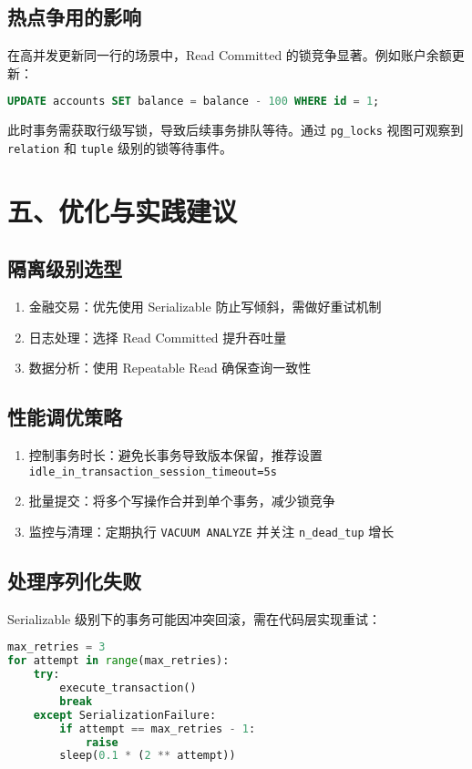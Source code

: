 \section{热点争用的影响}
在高并发更新同一行的场景中，Read Committed 的锁竞争显著。例如账户余额更新：\par
\begin{lstlisting}[language=sql]
UPDATE accounts SET balance = balance - 100 WHERE id = 1;
\end{lstlisting}
此时事务需获取行级写锁，导致后续事务排队等待。通过 \verb!pg_locks! 视图可观察到 \verb!relation! 和 \verb!tuple! 级别的锁等待事件。\par
\chapter{五、优化与实践建议}
\section{隔离级别选型}
\begin{enumerate}
\item 金融交易：优先使用 Serializable 防止写倾斜，需做好重试机制
\item 日志处理：选择 Read Committed 提升吞吐量
\item 数据分析：使用 Repeatable Read 确保查询一致性
\end{enumerate}
\section{性能调优策略}
\begin{enumerate}
\item 控制事务时长：避免长事务导致版本保留，推荐设置 \verb!idle_in_transaction_session_timeout=5s!
\item 批量提交：将多个写操作合并到单个事务，减少锁竞争
\item 监控与清理：定期执行 \verb!VACUUM ANALYZE! 并关注 \verb!n_dead_tup! 增长
\end{enumerate}
\section{处理序列化失败}
Serializable 级别下的事务可能因冲突回滚，需在代码层实现重试：\par
\begin{lstlisting}[language=python]
max_retries = 3
for attempt in range(max_retries):
    try:
        execute_transaction()
        break
    except SerializationFailure:
        if attempt == max_retries - 1:
            raise
        sleep(0.1 * (2 ** attempt))
\end{lstlisting}
